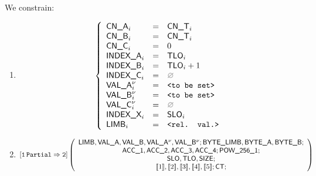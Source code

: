 \begin{center}
\end{center}

We constrain:
\begin{enumerate}
	\item 
\[
	\left\{
	\begin{array}{lclr}
		\cnA      _{i}       & = & \cnT_{i}            \\
		\cnB      _{i}       & = & \cnT_{i}            \\
		\cnC      _{i}       & = & 0                   \\
		\indexA   _{i}       & = & \tlo_{i}            \\
		\indexB   _{i}       & = & \tlo_{i} + 1        \\
		\indexC   _{i}       & = & \nothing            \\
		\valA     _{i}\new{} & = & \valueToBeSet       \\
		\valB     _{i}\new{} & = & \valueToBeSet       \\
		\valC     _{i}\new{} & = & \nothing            \\
		\indexX   _{i}       & = & \slo_{i}            \\
		\limb     _{i}       & = & \relevantValue      \\
	\end{array}
	\right.
\]
	\item 
\[
	\onePartialToTwo
	\left(
	\begin{array}{c}
		\limb{}, \valA{}, \valB{},
		\valA{}\new, \valB{}\new;
		\byteLimb{}, \BYTEA{}, \BYTEB{};
		\\
		\acc{1}, \acc{2}, \acc{3}, \acc{4}; \pow{1};
		\\
		\slo, \tlo, \size{};
		\\
		\bit{1}, \bit{2}, \bit{3}, \bit{4}, \bit{5}; \ct{};
	\end{array}
	\right)
\]
\end{enumerate}
